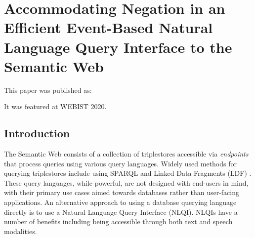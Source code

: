 \documentclass[../main.tex]{subfiles}
\begin{document}
\chapter{Accommodating Negation in an Efficient Event-Based Natural Language Query Interface to the Semantic Web}

\begin{refsection}

\label{chapter:webist2020conf}

This paper was published as:


It was featured at WEBIST 2020.


\section{Introduction}
\label{webist2020conf:introduction}


\noindent The Semantic Web consists of a collection of triplestores accessible via \textit{endpoints} that process queries using various query languages.  Widely used methods for querying triplestores include using SPARQL \cite{sparql} and Linked Data Fragments (LDF) \cite{verborgh2014web}.  These query languages, while powerful, are not designed with end-users in mind, with their primary use cases aimed towards databases rather than user-facing applications.
An alternative approach to using a database querying language directly is to use a Natural Language Query Interface (NLQI).  NLQIs have a number of benefits including being accessible through both text and speech modalities.


\end{refsection}
\end{document}
